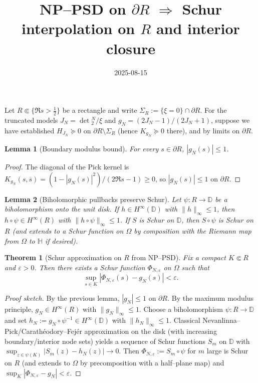 \documentclass[11pt]{article}
\title{NP--PSD on $\partial R$ $\Rightarrow$ Schur interpolation on $R$ and interior closure}
\date{2025-08-15}
\newtheorem{theorem}{Theorem}
\newtheorem{lemma}{Lemma}
\theoremstyle{remark}
\begin{document}
\maketitle

Let $R\Subset\{\Re s>\tfrac12\}$ be a rectangle and write $\Sigma_R:=\{\xi=0\}\cap\partial R$. For the truncated models $J_N=\det{}_2^N/\xi$ and $g_N=(2J_N-1)/(2J_N+1)$, suppose we have established $H_{J_N}\succeq0$ on $\partial R\setminus\Sigma_R$ (hence $K_{g_N}\succeq0$ there), and by limits on $\partial R$.

\begin{lemma}[Boundary modulus bound]
For every $s\in\partial R$, $|g_N(s)|\le 1$.
\end{lemma}
\begin{proof}
The diagonal of the Pick kernel is $K_{g_N}(s,\overline s)=(1-|g_N(s)|^2)/(2\Re s-1)\ge0$, so $|g_N(s)|\le1$ on $\partial R$.
\end{proof}

\begin{lemma}[Biholomorphic pullbacks preserve Schur]
Let $\psi:R\to\mathbb D$ be a biholomorphism onto the unit disk. If $h\in H^\infty(\mathbb D)$ with $\|h\|_\infty\le1$, then $h\circ\psi\in H^\infty(R)$ with $\|h\circ\psi\|_\infty\le1$. If $S$ is Schur on $\mathbb D$, then $S\circ\psi$ is Schur on $R$ (and extends to a Schur function on $\Omega$ by composition with the Riemann map from $\Omega$ to $\mathbb H$ if desired).
\end{lemma}

\begin{theorem}[Schur approximation on $R$ from NP--PSD]
Fix a compact $K\Subset R$ and $\varepsilon>0$. Then there exists a Schur function $\Phi_{N,\varepsilon}$ on $\Omega$ such that
\[\sup_{s\in K} |\Phi_{N,\varepsilon}(s)-g_N(s)|<\varepsilon.\]
\end{theorem}

\begin{proof}[Proof sketch]
By the previous lemma, $|g_N|\le1$ on $\partial R$. By the maximum modulus principle, $g_N\in H^\infty(R)$ with $\|g_N\|_\infty\le1$. Choose a biholomorphism $\psi:R\to\mathbb D$ and set $h_N:=g_N\circ\psi^{-1}\in H^\infty(\mathbb D)$ with $\|h_N\|_\infty\le1$. Classical Nevanlinna--Pick/Carath\'eodory--Fej\'er approximation on the disk (with increasing boundary/interior node sets) yields a sequence of Schur functions $S_m$ on $\mathbb D$ with $\sup_{z\in \psi(K)}|S_m(z)-h_N(z)|\to0$. Then $\Phi_{N,\varepsilon}:=S_m\circ\psi$ for $m$ large is Schur on $R$ (and extends to $\Omega$ by precomposition with a half--plane map) and $\sup_K|\Phi_{N,\varepsilon}-g_N|<\varepsilon$.
\end{proof}
\end{document}
